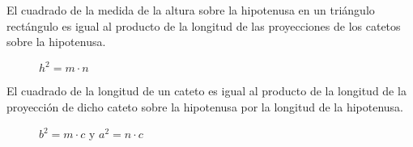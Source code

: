 \clearpage

\begin{theorem}
    El cuadrado de la medida de la altura sobre la hipotenusa en un triángulo rectángulo es igual al producto de la longitud de las proyecciones de los catetos sobre la hipotenusa.

    \begin{figure}[!h]
        \centering
        
        \caption{$h^2 = m \cdot n$}
        \label{fig:projection-hypothenuse-theorem}
    \end{figure}    
    
\end{theorem}

\begin{theorem}
    El cuadrado de la longitud de un cateto es igual al producto de la longitud de la proyección de dicho cateto sobre la hipotenusa por la longitud de la hipotenusa.

    \begin{figure}[!h]
        \centering
        
        \caption{$b^2 = m \cdot c$ y $a^2 = n \cdot c$}
        \label{fig:theorem-leg-hypothenuse-projection}
    \end{figure}    
    
\end{theorem}